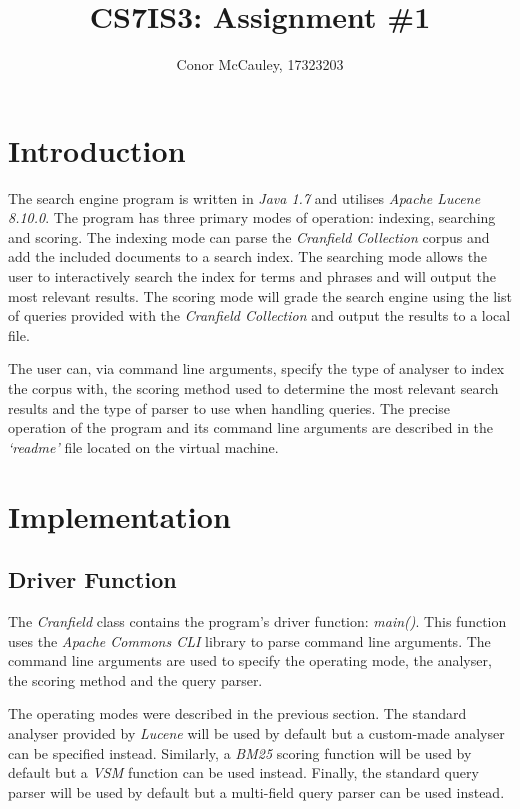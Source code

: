 \documentclass[journal]{IEEEtran}
\begin{document}
\title{CS7IS3: Assignment \#1}
\author{Conor McCauley, 17323203}

\maketitle

\section{Introduction}

The search engine program is written in \textit{Java 1.7} and utilises \textit{Apache Lucene 8.10.0}. The program has three primary modes of operation: indexing, searching and scoring. The indexing mode can parse the \textit{Cranfield Collection} corpus and add the included documents to a search index. The searching mode allows the user to interactively search the index for terms and phrases and will output the most relevant results. The scoring mode will grade the search engine using the list of queries provided with the \textit{Cranfield Collection} and output the results to a local file.

The user can, via command line arguments, specify the type of analyser to index the corpus with, the scoring method used to determine the most relevant search results and the type of parser to use when handling queries. The precise operation of the program and its command line arguments are described in the \textit{`readme'} file located on the virtual machine.

\section{Implementation}

\subsection{Driver Function}

The \textit{Cranfield} class contains the program's driver function: \textit{main()}. This function uses the \textit{Apache Commons CLI} library to parse command line arguments. The command line arguments are used to specify the operating mode, the analyser, the scoring method and the query parser.

The operating modes were described in the previous section. The standard analyser provided by \textit{Lucene} will be used by default but a custom-made analyser can be specified instead. Similarly, a \textit{BM25} scoring function will be used by default but a \textit{VSM} function can be used instead. Finally, the standard query parser will be used by default but a multi-field query parser can be used instead.
\end{document}

